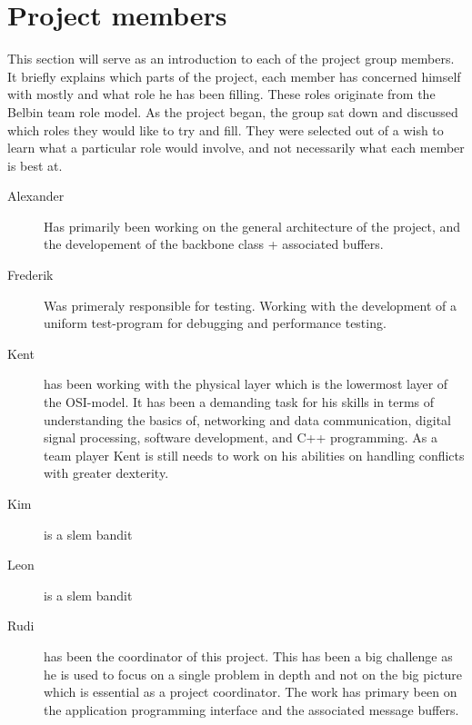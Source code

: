 \section{Project members}
This section will serve as an introduction to each of the project group members. It briefly explains which parts of the project, each member has concerned himself with mostly and what role he has been filling. These roles originate from the Belbin team role model. As the project began, the group sat down and discussed which roles they would like to try and fill. They were selected out of a wish to learn what a particular role would involve, and not necessarily what each member is best at.

\begin{description}
\item[Alexander] Has primarily been working on the general architecture of the project, and the developement of the backbone class + associated buffers.
\item[Frederik] Was primeraly responsible for testing. Working with the development of a uniform test-program for debugging and performance testing.
\item[Kent]
has been working with the physical layer which is the lowermost layer of the OSI-model. It has been a demanding task for his skills in terms of understanding the basics of, networking and data communication, digital signal processing, software development, and C++ programming. As a team player Kent is still needs to work on his abilities on handling conflicts with greater dexterity.
\item[Kim] is a slem bandit
\item[Leon] is a slem bandit
\item[Rudi] has been the coordinator of this project. This has been a big challenge as he is used to focus on a single problem in depth and not on the big picture which is essential as a project coordinator. The work has primary been on the application programming interface and the associated message buffers.
\end{description}